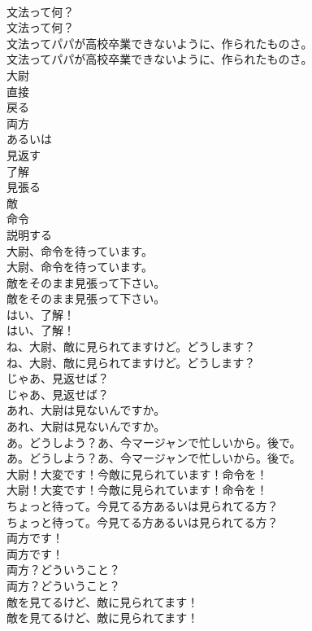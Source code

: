 \documentclass[8pt]{extreport}
\begin{document}
\begin{CJK}{UTF8}{min}
\\	文法って何？	
\\	文法って何？ 
\\	文法ってパパが高校卒業できないように、作られたものさ。	
\\	文法ってパパが高校卒業できないように、作られたものさ。 
\\	大尉
\\	直接
\\	戻る
\\	両方
\\	あるいは
\\	見返す
\\	了解
\\	見張る
\\	敵
\\	命令
\\	説明する
\\	大尉、命令を待っています。	
\\	大尉、命令を待っています。 
\\	敵をそのまま見張って下さい。	
\\	敵をそのまま見張って下さい。 
\\	はい、了解！	
\\	はい、了解！ 
\\	ね、大尉、敵に見られてますけど。どうします？	
\\	ね、大尉、敵に見られてますけど。どうします？ 
\\	じゃあ、見返せば？	
\\	じゃあ、見返せば？ 
\\	あれ、大尉は見ないんですか。	
\\	あれ、大尉は見ないんですか。 
\\	あ。どうしよう？あ、今マージャンで忙しいから。後で。	
\\	あ。どうしよう？あ、今マージャンで忙しいから。後で。 
\\	大尉！大変です！今敵に見られています！命令を！	
\\	大尉！大変です！今敵に見られています！命令を！ 
\\	ちょっと待って。今見てる方あるいは見られてる方？	
\\	ちょっと待って。今見てる方あるいは見られてる方？ 
\\	両方です！	
\\	両方です！ 
\\	両方？どういうこと？	
\\	両方？どういうこと？ 
\\	敵を見てるけど、敵に見られてます！	
\\	敵を見てるけど、敵に見られてます！ 

\end{CJK}
\end{document}
